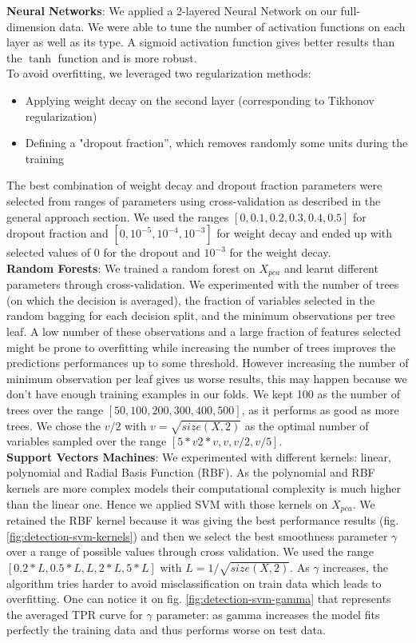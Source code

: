 \documentclass[10pt,a4paper]{article}
\begin{document}
    \textbf{Neural Networks}: We applied a 2-layered Neural Network on our full-dimension data. We were able to tune the number of activation functions on each layer as well as its type. A sigmoid activation function gives better results than the $\tanh$ function and is more robust.\\
  To avoid overfitting, we leveraged two regularization methods:
  \begin{itemize}
   	\item Applying weight decay on the second layer (corresponding to Tikhonov regularization)
	  \item Defining a "dropout fraction'', which removes randomly some units during the training \cite{dropout}
  \end{itemize}
	The best combination of weight decay and dropout fraction parameters were selected from ranges of parameters using cross-validation as described in the general approach section. We used  the ranges $[0, 0.1, 0.2, 0.3, 0.4, 0.5]$ for dropout fraction and $[0, 10^{-5}, 10^{-4}, 10^{-3}]$ for weight decay and ended up with selected values of $0$ for the dropout and $10^{-3}$ for the weight decay.\\

    \textbf{Random Forests}: We trained a random forest on $X_{pca}$ and learnt different parameters through cross-validation. We experimented with the number of trees (on which the decision is averaged), the fraction of variables selected in the random bagging for each decision split, and the minimum observations per tree leaf. A low number of these observations and a large fraction of features selected might be prone to overfitting while increasing the number of trees improves the predictions performances up to some threshold. However increasing the number of minimum observation per leaf gives us worse results, this may happen because we don't have enough training examples in our folds. We kept 100 as the number of trees over the range $[50, 100, 200, 300, 400, 500]$, as it performs as good as more trees. We chose the $v/ 2$ with $v = \sqrt{size(X,2)}$ as the optimal number of variables sampled over the range $[5*v 2*v, v, v/ 2, v/ 5]$.\\

  \textbf{Support Vectors Machines}: We experimented with different kernels: linear, polynomial and Radial Basis Function (RBF). As the polynomial and RBF kernels are more complex models their computational complexity is much higher than the linear one. Hence we applied SVM with those kernels on $X_{pca}$. We retained the RBF kernel because it was giving the best performance results (fig. \ref{fig:detection-svm-kernels}) and then we select the best smoothness parameter $\gamma$ over a range of possible values through cross validation. We used the range $[0.2*L, 0.5*L, L, 2*L, 5*L]$ with $L = 1 / \sqrt{size(X,2)}$. As $\gamma$ increases, the algorithm tries harder to avoid misclassification on train data which leads to overfitting. One can notice it on fig. \ref{fig:detection-svm-gamma} that represents the averaged TPR curve for $\gamma$ parameter: as gamma increases the model fits perfectly the training data and thus performs worse on test data.\\
\end{document}
